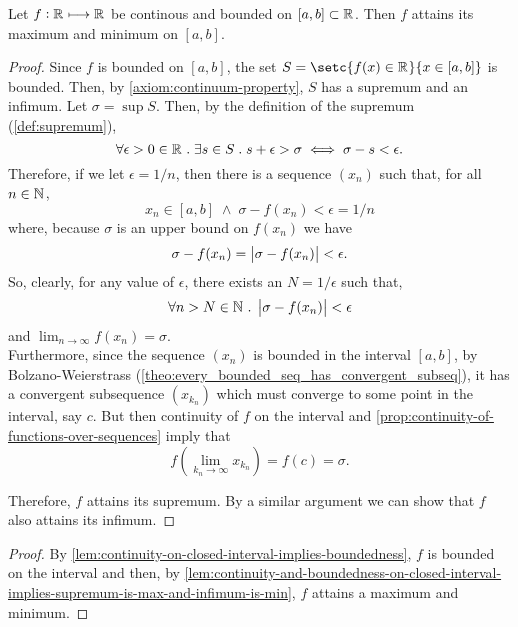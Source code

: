 \documentclass[../MathsNotesBase.tex]{subfiles}
\begin{document}
	\bigskip
	\begin{lemma}\label{lem:continuity-and-boundedness-on-closed-interval-implies-supremum-is-max-and-infimum-is-min}
		Let $f: \mathbb{R}^{} \longmapsto \mathbb{R}^{} $ be continous and bounded on ${ [a,b] \subset \mathbb{R}^{} }$. Then $f$ attains its maximum and minimum on ${ [a,b] }$.
	\end{lemma}
	\begin{proof}
		Since $f$ is bounded on ${ [a,b] }$, the set ${ S = \setc{ f(x) \in \R{} }{ x \in [a,b] } }$ is bounded. Then, by \autoref{axiom:continuum-property}, $S$ has a supremum and an infimum. Let ${ \sigma = \sup S }$. Then, by the definition of the supremum (\ref{def:supremum}),
		\[ \forall \epsilon > 0 \in \mathbb{R}^{} \;.\; \exists s \in S \;.\; s + \epsilon > \sigma \iff \sigma - s < \epsilon. \]
		Therefore, if we let ${ \epsilon = 1/n }$, then there is a sequence $(x_n)$ such that, for all ${ n \in \mathbb{N}^{} }$,
		\[ x_n \in [a,b] \; \land \; \sigma - f(x_n) < \epsilon = 1/n \]
		where, because $\sigma$ is an upper bound on $f(x_n)$ we have 
		\[ \sigma - f(x_n) = \left\lvert\sigma - f(x_n)\right\rvert < \epsilon. \]
		So, clearly, for any value of $\epsilon$, there exists an ${ N = 1/\epsilon }$ such that,
		\[ \forall n > N \in \mathbb{N}^{} \;.\; \left\lvert\sigma - f(x_n)\right\rvert < \epsilon \]
		and ${ \lim_{n \to \infty} f(x_n) = \sigma }$.\\
		
		Furthermore, since the sequence $(x_n)$ is bounded in the interval $[a,b]$, by Bolzano-Weierstrass (\autoref{theo:every_bounded_seq_has_convergent_subseq}), it has a convergent subsequence $(x_{k_n})$ which must converge to some point in the interval, say $c$. But then continuity of $f$ on the interval and \autoref{prop:continuity-of-functions-over-sequences} imply that
		\[ f\left( \lim_{k_n \to \infty} x_{k_n} \right) = f(c) = \sigma. \]
		
		Therefore, $f$ attains its supremum. By a similar argument we can show that $f$ also attains its infimum.
	\end{proof}

	\bigskip
	\begin{proof}
		By \autoref{lem:continuity-on-closed-interval-implies-boundedness}, $f$ is bounded on the interval and then, by \autoref{lem:continuity-and-boundedness-on-closed-interval-implies-supremum-is-max-and-infimum-is-min}, $f$ attains a maximum and minimum.
	\end{proof}
\end{document}
